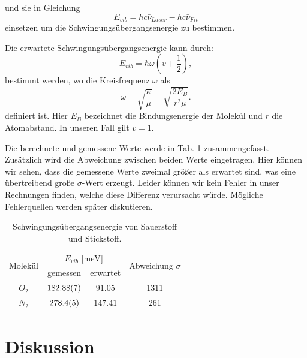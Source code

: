 \documentclass[11 pt]{article}
\begin{document}
und sie in Gleichung
\begin{equation}
E_{vib} = hc\bar{\nu}_{Laser}- hc\bar{\nu}_{Fit}
\end{equation}
einsetzen um die Schwingungsübergangsenergie zu bestimmen. 

Die erwartete Schwingungsübergangsenergie kann durch:
\begin{equation}
E_{vib} = \hbar \omega \left( v + \dfrac{1}{2} \right),
\end{equation}
bestimmt werden, wo die Kreisfrequenz $\omega$ als 
\begin{equation}
\omega = \sqrt{\dfrac{\kappa}{\mu}} = \sqrt{\dfrac{2E_{B}}{r^2\mu}}.
\end{equation}
definiert ist. Hier $E_B$ bezeichnet die Bindungsenergie der Molekül und $r$ die Atomabstand. In unseren Fall gilt $v = 1$. 

Die berechnete und gemessene Werte werde in Tab. \ref{tab:N_O} zusammengefasst. Zusätzlich wird die Abweichung zwischen beiden Werte eingetragen. Hier können wir sehen, dass die gemessene Werte zweimal größer als erwartet sind, was eine übertreibend große $\sigma$-Wert erzeugt. Leider können wir kein Fehler in unser Rechnungen finden, welche diese Differenz verursacht würde. Mögliche Fehlerquellen werden später diskutieren.

\begin{table}[!htbp]
 \begin{center}
  \caption{ \small Schwingungsübergangsenergie von Sauerstoff und Stickstoff.}
  \label{tab:N_O}
  \renewcommand{\arraystretch}{1.3}
  \begin{tabular}{|c|c|c|c|}
  \hline

\multirow{2}{*}{Molekül}& \multicolumn{2}{c|}{$E_{vib}$ [$\unit{\milli\electronvolt}$]} &  \multirow{2}{*}{ Abweichung $\sigma$} \\ \cline{2-3} %
 					 & gemessen & erwartet &    			\\
  \hline
  \hline
  $O_2$	&	$\num{182.88 \pm 0.07}$	&	$\num{91.05}$ &	1311\\
  $N_2$	&	$\num{278.4 \pm 0.5}$	&	$\num{147.41}$&	261\\ 
  \hline
  \end{tabular}
  \renewcommand{\arraystretch}{1}
 \end{center}
\end{table}


\section{Diskussion}
\end{document}
